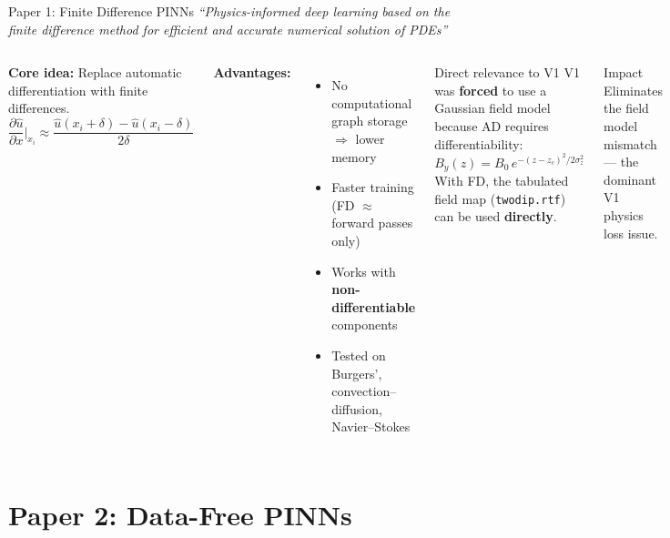 \documentclass[aspectratio=169, 11pt]{beamer}
\begin{document}
\begin{frame}{Paper 1: Finite Difference PINNs}
  \textit{``Physics-informed deep learning based on the finite difference method for efficient and accurate numerical solution of PDEs''}

  \begin{columns}[T]
    \textbf{Core idea:} Replace automatic differentiation with finite differences.
    \[
      \frac{\partial \hat{u}}{\partial x}\bigg|_{x_i} \approx \frac{\hat{u}(x_i + \delta) - \hat{u}(x_i - \delta)}{2\delta}
    \]

    \textbf{Advantages:}
    \begin{itemize}
      \item No computational graph storage $\Rightarrow$ lower memory
      \item Faster training (FD $\approx$ forward passes only)
      \item Works with \textbf{non-differentiable} components
      \item Tested on Burgers', convection--diffusion, Navier--Stokes
    \end{itemize}

    \begin{alertblock}{Direct relevance to V1}
      V1 was \textbf{forced} to use a Gaussian field model because AD requires differentiability:
      \[
        B_y(z) = B_0\, e^{-(z-z_c)^2/2\sigma_z^2}
      \]
      With FD, the tabulated field map (\texttt{twodip.rtf}) can be used \textbf{directly}.
    \end{alertblock}

    \begin{exampleblock}{Impact}
      Eliminates the field model mismatch --- the dominant V1 physics loss issue.
    \end{exampleblock}
  \end{columns}
\end{frame}

\section{Paper 2: Data-Free PINNs}
\end{document}
